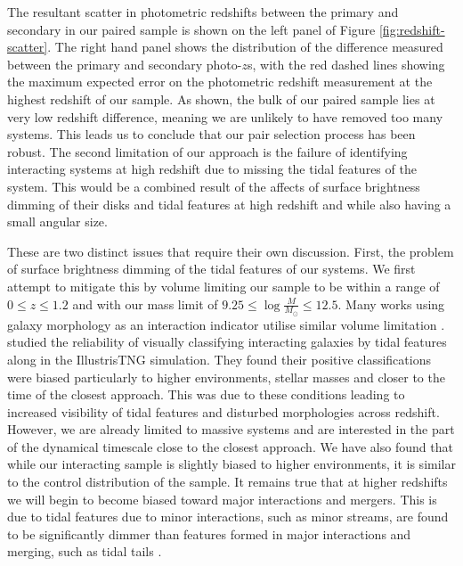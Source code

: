 The resultant scatter in photometric redshifts between the primary and secondary in our paired sample is shown on the left panel of Figure \ref{fig:redshift-scatter}. The right hand panel shows the distribution of the difference measured between the primary and secondary photo-$z$s, with the red dashed lines showing the maximum expected error on the photometric redshift measurement at the highest redshift of our sample. As shown, the bulk of our paired sample lies at very low redshift difference, meaning we are unlikely to have removed too many systems. This leads us to conclude that our pair selection process has been robust. The second limitation of our approach is the failure of identifying interacting systems at high redshift due to missing the tidal features of the system. This would be a combined result of the affects of surface brightness dimming of their disks and tidal features at high redshift and while also having a small angular size. 

These are two distinct issues that require their own discussion. First, the problem of surface brightness dimming of the tidal features of our systems. We first attempt to mitigate this by volume limiting our sample to be within a range of $0 \leq z \leq 1.2$ and with our mass limit of $9.25 \leq \log \frac{M}{M_\odot} \leq 12.5$. Many works using galaxy morphology as an interaction indicator utilise similar volume limitation \citep{2007MNRAS.381..962C, 2009MNRAS.394.1956C, 2022MNRAS.513.1459M, 2024MNRAS.530.4422K}. \citet{2020MNRAS.492.2075B} studied the reliability of visually classifying interacting galaxies by tidal features along in the IllustrisTNG simulation. They found their positive classifications were biased particularly to higher environments, stellar masses and closer to the time of the closest approach. This was due to these conditions leading to increased visibility of tidal features and disturbed morphologies across redshift. However, we are already limited to massive systems and are interested in the part of the dynamical timescale close to the closest approach. We have also found that while our interacting sample is slightly biased to higher environments, it is similar to the control distribution of the sample. It remains true that at higher redshifts we will begin to become biased toward major interactions and mergers. This is due to tidal features due to minor interactions, such as minor streams, are found to be significantly dimmer than features formed in major interactions and merging, such as tidal tails \citep{2022A&A...662A.124S}.


